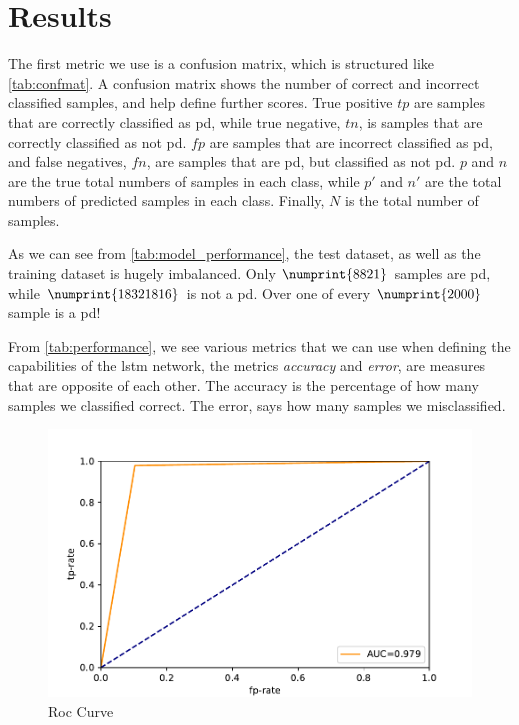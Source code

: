 \section{Results}
The first metric we use is a confusion matrix, which is structured like \autoref{tab:confmat}. A confusion matrix shows the number of correct and incorrect classified samples, and help define further scores. True positive $tp$ are samples that are correctly classified as \ac{pd}, while true negative, $tn$, is samples that are correctly classified as not \ac{pd}. $fp$ are samples that are incorrect classified as \ac{pd}, and false negatives, $fn$, are samples that are \ac{pd}, but classified as not \ac{pd}. $p$ and $n$ are the true total numbers of samples in each class, while $p'$ and $n'$ are the total numbers of predicted samples in each class. Finally, $N$ is the total number of samples.




As we can see from \autoref{tab:model_performance}, the test dataset, as well as the training dataset is hugely imbalanced. Only $\numprint{8821}$ samples are \ac{pd}, while $\numprint{18321816}$ is not a \ac{pd}. Over one of every $\numprint{2000}$ sample is a \ac{pd}!



From \autoref{tab:performance}, we see various metrics that we can use when defining the capabilities of the \ac{lstm} network, the metrics \emph{accuracy} and \emph{error}, are measures that are opposite of each other. The accuracy is the percentage of how many samples we classified correct. The error, says how many samples we misclassified. 

\begin{figure}[ht]
    \centering
    \includegraphics[width=\textwidth]{results/roc.pdf}
    \caption{Roc Curve}
    \label{fig:roc}
\end{figure} 

